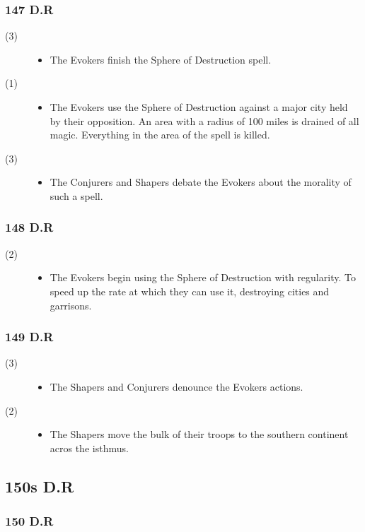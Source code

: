 \documentclass[a4paper, 11pt]{article}
\def\level#1{\item[(#1)\hspace{9.5pt}]}
\newenvironment{knowlevels}{\begin{description}}{\end{description}} %
\def\decadeblk#1{\subsection{#1}}
\def\yearblk#1{\subsubsection{#1}}
\begin{document}
\yearblk{147 D.R}
\begin{knowlevels}
\level{3} {
\begin{itemize}
\item The Evokers finish the Sphere of Destruction spell.
\end{itemize}
}
\level{1} {
\begin{itemize}
\item The Evokers use the Sphere of Destruction against a major city held by their opposition. An area with a radius of 100 miles is drained of all magic. Everything in the area of the spell is killed.
\end{itemize}
}
\level{3} {
\begin{itemize}
\item The Conjurers and Shapers debate the Evokers about the morality of such a spell.
\end{itemize}
}
\end{knowlevels}

\yearblk{148 D.R}
\begin{knowlevels}
\level{2} {
\begin{itemize}
\item The Evokers begin using the Sphere of Destruction with regularity. To speed up the rate at which they can use it, destroying cities and garrisons.
\end{itemize}
}
\end{knowlevels}

\yearblk{149 D.R}
\begin{knowlevels}
\level{3} {
\begin{itemize}
\item The Shapers and Conjurers denounce the Evokers actions.
\end{itemize}
}
\level{2} {
\begin{itemize}
\item The Shapers move the bulk of their troops to the southern continent acros the isthmus.
\end{itemize}
}
\end{knowlevels}

\decadeblk{150s D.R}
\yearblk{150 D.R}
\end{document}
